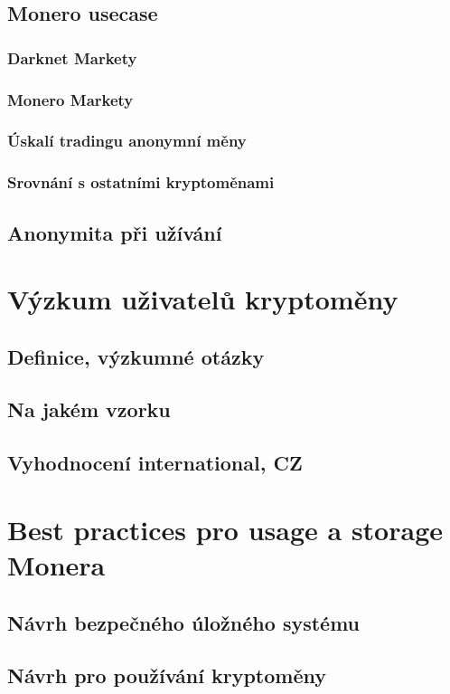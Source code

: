 \documentclass[
  printed, %
  table,   %
  nolof,     %
  nolot,     %
           oneside, color
]{fithesis3}
\begin{document}
\section{Monero usecase}
\subsection{Darknet Markety}
\subsection{Monero Markety}
\subsection{Úskalí tradingu anonymní měny}
\subsection{Srovnání s ostatními kryptoměnami}

\section{Anonymita při užívání}

\chapter{Výzkum uživatelů kryptoměny}
\section{Definice, výzkumné otázky}
\section{Na jakém vzorku}
\section{Vyhodnocení international, CZ}

\chapter{Best practices pro usage a storage Monera}
\section{Návrh bezpečného úložného systému}
\section{Návrh pro používání kryptoměny}
\end{document}
